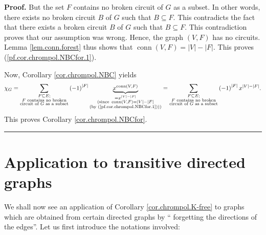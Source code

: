 \documentclass[numbers=enddot,12pt,final,onecolumn,notitlepage]{scrartcl}%
\theoremstyle{definition}
\newenvironment{proof}[1][Proof]{\noindent\textbf{#1.} }{\ \rule{0.5em}{0.5em}}
\newenvironment{verlong}{}{}
\let\sumnonlimits\sum
\renewcommand{\sum}{\sumnonlimits\limits}
\begin{document}
\begin{verlong}
\begin{proof}
But the set $F$ contains no broken circuit of $G$ as a subset. In other words,
there exists no broken circuit $B$ of $G$ such that $B\subseteq F$. This
contradicts the fact that there exists a broken circuit $B$ of $G$ such that
$B\subseteq F$. This contradiction proves that our assumption was wrong.
Hence, the graph $\left(  V,F\right)  $ has no circuits. Lemma
\ref{lem.conn.forest} thus shows that $\operatorname*{conn}\left(  V,F\right)
=\left\vert V\right\vert -\left\vert F\right\vert $. This proves
(\ref{pf.cor.chrompol.NBCfor.1}).

Now, Corollary \ref{cor.chrompol.NBC} yields%
\[
\chi_{G}=\sum_{\substack{F\subseteq E;\\F\text{ contains no broken}%
\\\text{circuit of }G\text{ as a subset}}}\left(  -1\right)  ^{\left\vert
F\right\vert }\underbrace{x^{\operatorname*{conn}\left(  V,F\right)  }%
}_{\substack{=x^{\left\vert V\right\vert -\left\vert F\right\vert
}\\\text{(since }\operatorname*{conn}\left(  V,F\right)  =\left\vert
V\right\vert -\left\vert F\right\vert \\\text{(by
(\ref{pf.cor.chrompol.NBCfor.1})))}}}=\sum_{\substack{F\subseteq E;\\F\text{
contains no broken}\\\text{circuit of }G\text{ as a subset}}}\left(
-1\right)  ^{\left\vert F\right\vert }x^{\left\vert V\right\vert -\left\vert
F\right\vert }.
\]
This proves Corollary \ref{cor.chrompol.NBCfor}.
\end{proof}
\end{verlong}

\section{Application to transitive directed graphs}

We shall now see an application of Corollary \ref{cor.chrompol.K-free} to
graphs which are obtained from certain directed graphs by \textquotedblleft
forgetting the directions of the edges\textquotedblright. Let us first
introduce the notations involved:
\end{document}
